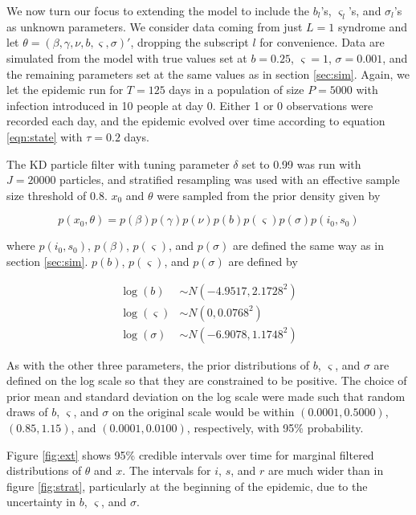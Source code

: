 \documentclass{elsarticle}
\begin{document}
We now turn our focus to extending the model to include the $b_l$'s, $\varsigma_l$'s, and $\sigma_l$'s as unknown parameters.  We consider data coming from just $L = 1$ syndrome and let $\theta = (\beta, \gamma, \nu, b, \varsigma, \sigma)'$, dropping the subscript $l$ for convenience.  Data are simulated from the model with true values set at $b = 0.25$, $\varsigma = 1$, $\sigma = 0.001$, and the remaining parameters set at the same values as in section \ref{sec:sim}.  Again, we let the epidemic run for $T = 125$ days in a population of size $P = 5000$ with infection introduced in 10 people at day 0.  Either 1 or 0 observations were recorded each day, and the epidemic evolved over time according to equation \eqref{eqn:state} with $\tau = 0.2$ days.

The KD particle filter with tuning parameter $\delta$ set to 0.99 was run with $J = 20000$ particles, and stratified resampling was used with an effective sample size threshold of 0.8.  $x_0$ and $\theta$ were sampled from the prior density given by

\[p\left(x_0,\theta\right) = p\left(\beta\right)p\left(\gamma\right)p\left(\nu\right)p\left(b\right)p\left(\varsigma\right)p\left(\sigma\right)p\left(i_0,s_0\right)\]

\noindent where $p(i_0,s_0)$, $p(\beta)$, $p(\varsigma)$, and $p(\sigma)$ are defined the same way as in section \ref{sec:sim}.  $p(b)$, $p(\varsigma)$, and $p(\sigma)$ are defined by

\begin{align*}
\log(b) &\sim  N(-4.9517, 2.1728^2) \\
\log(\varsigma) &\sim N(0, 0.0768^2) \\
\log(\sigma) &\sim N(-6.9078, 1.1748^2)
\end{align*}

As with the other three parameters, the prior distributions of $b$, $\varsigma$, and $\sigma$ are defined on the log scale so that they are constrained to be positive.  The choice of prior mean and standard deviation on the log scale were made such that random draws of $b$, $\varsigma$, and $\sigma$ on the original scale would be within $(0.0001, 0.5000)$, $(0.85, 1.15)$, and $(0.0001, 0.0100)$, respectively, with 95\% probability.

Figure \ref{fig:ext} shows 95\% credible intervals over time for marginal filtered distributions of $\theta$ and $x$.  The intervals for $i$, $s$, and $r$ are much wider than in figure \ref{fig:strat}, particularly at the beginning of the epidemic, due to the uncertainty in $b$, $\varsigma$, and $\sigma$.
\end{document}
